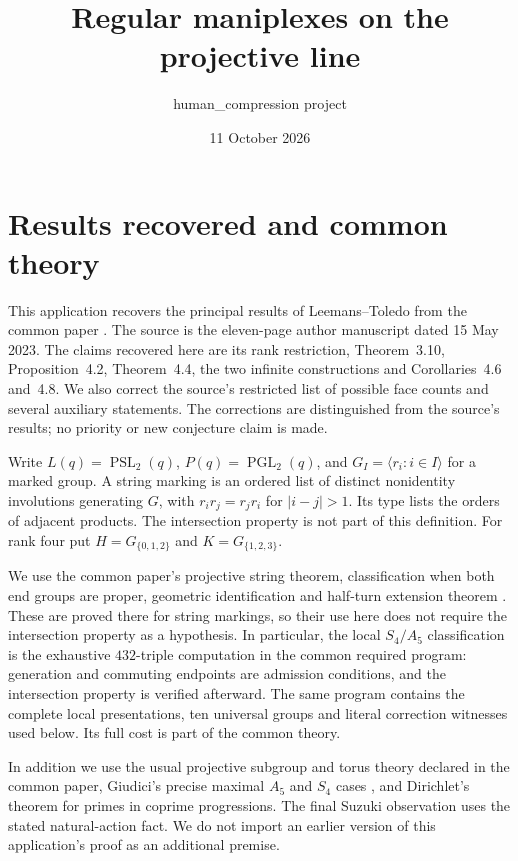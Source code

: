 \documentclass[11pt]{article}
\title{Regular maniplexes on the projective line}
\author{human\_compression project}
\date{11 October 2026}
\newcommand{\PSL}{\operatorname{PSL}_2}
\newcommand{\PGL}{\operatorname{PGL}_2}
\newcommand{\gen}[1]{\langle #1\rangle}
\begin{document}
\maketitle

\section{Results recovered and common theory}
This application recovers the principal results of Leemans--Toledo
\cite{LT} from the common paper \cite{U}. The source is the eleven-page
author manuscript dated 15 May 2023. The claims recovered here are its
rank restriction, Theorem~3.10, Proposition~4.2, Theorem~4.4, the two
infinite constructions and Corollaries~4.6 and~4.8. We also correct the
source's restricted list of possible face counts and several auxiliary
statements. The corrections are distinguished from the source's results;
no priority or new conjecture claim is made.

Write $L(q)=\PSL(q)$, $P(q)=\PGL(q)$, and
$G_I=\gen{r_i:i\in I}$ for a marked group. A string marking is an ordered
list of distinct nonidentity involutions generating $G$, with
$r_i r_j=r_j r_i$ for $|i-j|>1$. Its type lists the orders of adjacent
products. The intersection property is not part of this definition.
For rank four put $H=G_{\{0,1,2\}}$ and $K=G_{\{1,2,3\}}$.

We use the common paper's projective string theorem, classification
when both end groups are proper, geometric identification and half-turn extension theorem
\cite[Theorems~4, 6, 8, 9 and Corollary~7]{U}. These are proved there for string markings,
so their use here does not require the intersection property as a hypothesis. In
particular, the local $S_4/A_5$ classification is the exhaustive
$432$-triple computation in the common required program: generation and
commuting endpoints are admission conditions, and the intersection
property is verified afterward. The same program contains the complete
local presentations, ten universal groups and literal correction witnesses
used below. Its full cost is part of the common theory.

In addition we use the usual projective subgroup and
torus theory declared in the common paper, Giudici's precise maximal
$A_5$ and $S_4$ cases \cite[Theorem~2.2(6),(8)]{Giudici}, and Dirichlet's
theorem for primes in coprime progressions. The final Suzuki observation
uses the stated natural-action fact. We do not import an earlier version
of this application's proof as an additional premise.
\end{document}
